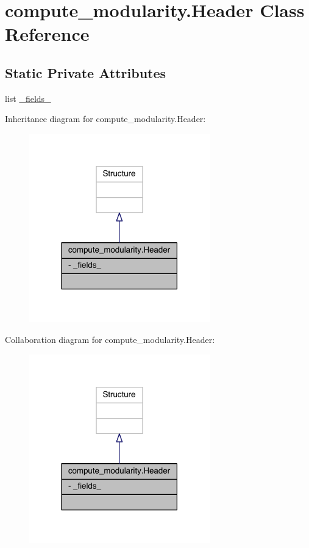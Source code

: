 \hypertarget{classcompute__modularity_1_1_header}{\section{compute\+\_\+modularity.\+Header Class Reference}
\label{classcompute__modularity_1_1_header}
}
\subsection*{Static Private Attributes}
\begin{DoxyCompactItemize}
\item 
list \hyperlink{classcompute__modularity_1_1_header_a4e36791456587ddb0232817a0ef68f24}{\+\_\+fields\+\_\+}
\end{DoxyCompactItemize}


Inheritance diagram for compute\+\_\+modularity.\+Header\+:\nopagebreak
\begin{figure}[H]
\begin{center}
\leavevmode
\includegraphics[width=222pt]{classcompute__modularity_1_1_header__inherit__graph}
\end{center}
\end{figure}


Collaboration diagram for compute\+\_\+modularity.\+Header\+:\nopagebreak
\begin{figure}[H]
\begin{center}
\leavevmode
\includegraphics[width=222pt]{classcompute__modularity_1_1_header__coll__graph}
\end{center}
\end{figure}


